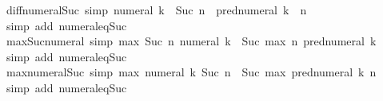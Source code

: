 \begin{isabellebody}
\ diff{\isacharunderscore}{\kern0pt}numeral{\isacharunderscore}{\kern0pt}Suc\ {\isacharbrackleft}{\kern0pt}simp{\isacharbrackright}{\kern0pt}{\isacharcolon}{\kern0pt}\ {\isachardoublequoteopen}numeral\ k\ {\isacharminus}{\kern0pt}\ Suc\ n\ {\isacharequal}{\kern0pt}\ pred{\isacharunderscore}{\kern0pt}numeral\ k\ {\isacharminus}{\kern0pt}\ n{\isachardoublequoteclose}\isanewline
%
\isadelimproof
\ \ %
\endisadelimproof
%
\isatagproof
{}\isamarkupfalse%
\ {\isacharparenleft}{\kern0pt}simp\ add{\isacharcolon}{\kern0pt}\ numeral{\isacharunderscore}{\kern0pt}eq{\isacharunderscore}{\kern0pt}Suc{\isacharparenright}{\kern0pt}%
\endisatagproof
{\isafoldproof}%
%
\isadelimproof
\isanewline
%
\endisadelimproof
\isanewline
{}\isamarkupfalse%
\ max{\isacharunderscore}{\kern0pt}Suc{\isacharunderscore}{\kern0pt}numeral\ {\isacharbrackleft}{\kern0pt}simp{\isacharbrackright}{\kern0pt}{\isacharcolon}{\kern0pt}\ {\isachardoublequoteopen}max\ {\isacharparenleft}{\kern0pt}Suc\ n{\isacharparenright}{\kern0pt}\ {\isacharparenleft}{\kern0pt}numeral\ k{\isacharparenright}{\kern0pt}\ {\isacharequal}{\kern0pt}\ Suc\ {\isacharparenleft}{\kern0pt}max\ n\ {\isacharparenleft}{\kern0pt}pred{\isacharunderscore}{\kern0pt}numeral\ k{\isacharparenright}{\kern0pt}{\isacharparenright}{\kern0pt}{\isachardoublequoteclose}\isanewline
%
\isadelimproof
\ \ %
\endisadelimproof
%
\isatagproof
{}\isamarkupfalse%
\ {\isacharparenleft}{\kern0pt}simp\ add{\isacharcolon}{\kern0pt}\ numeral{\isacharunderscore}{\kern0pt}eq{\isacharunderscore}{\kern0pt}Suc{\isacharparenright}{\kern0pt}%
\endisatagproof
{\isafoldproof}%
%
\isadelimproof
\isanewline
%
\endisadelimproof
\isanewline
{}\isamarkupfalse%
\ max{\isacharunderscore}{\kern0pt}numeral{\isacharunderscore}{\kern0pt}Suc\ {\isacharbrackleft}{\kern0pt}simp{\isacharbrackright}{\kern0pt}{\isacharcolon}{\kern0pt}\ {\isachardoublequoteopen}max\ {\isacharparenleft}{\kern0pt}numeral\ k{\isacharparenright}{\kern0pt}\ {\isacharparenleft}{\kern0pt}Suc\ n{\isacharparenright}{\kern0pt}\ {\isacharequal}{\kern0pt}\ Suc\ {\isacharparenleft}{\kern0pt}max\ {\isacharparenleft}{\kern0pt}pred{\isacharunderscore}{\kern0pt}numeral\ k{\isacharparenright}{\kern0pt}\ n{\isacharparenright}{\kern0pt}{\isachardoublequoteclose}\isanewline
%
\isadelimproof
\ \ %
\endisadelimproof
%
\isatagproof
{}\isamarkupfalse%
\ {\isacharparenleft}{\kern0pt}simp\ add{\isacharcolon}{\kern0pt}\ numeral{\isacharunderscore}{\kern0pt}eq{\isacharunderscore}{\kern0pt}Suc{\isacharparenright}{\kern0pt}%
\endisatagproof
{\isafoldproof}%
%
\isadelimproof

\end{isabellebody}
